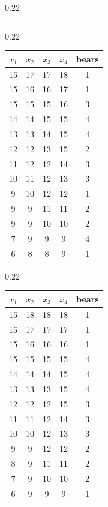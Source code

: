 \documentclass[10pt]{article}
\theoremstyle{definition}
\begin{document}
\begin{table}[h]
\begin{subtable}{0.22\textwidth}
\begin{tabular*}{\linewidth}{@{\extracolsep{\fill}}ccccc}
\bottomrule
\end{tabular*}
\label{tab:sub2}
\end{subtable}%
\hfill
\begin{subtable}{0.22\textwidth}
\begin{tabular*}{\linewidth}{@{\extracolsep{\fill}}ccccc}
\toprule
$x_1$ & $x_2$ & $x_3$ & $x_4$  &  bears \\
\midrule
15& 17& 17& 18&1 \\
15& 16 &16 &17&1 \\
15& 15& 15& 16 & 3 \\
\hline
14& 14& 15 &15& 4 \\
13& 13& 14 &15&  4 \\
12& 12& 13& 15 & 2 \\
\hline
11 &12& 12& 14&3  \\
10& 11& 12& 13 &3\\
9 & 10& 12& 12& 1\\
\hline
9 &9& 11 &11& 2 \\
9 &9 &10& 10 &2\\
7 &9& 9& 9 & 4\\
\hline
6& 8 &8& 9& 1\\
\bottomrule
\end{tabular*}
 \label{tab:sub3}
\end{subtable}
\hfill
\begin{subtable}{0.22\textwidth}
\begin{tabular*}{\linewidth}{@{\extracolsep{\fill}}ccccc} 
\toprule
$x_1$ & $x_2$ & $x_3$ & $x_4$  &  bears \\
\midrule
15 &  18 &  18  & 18  &  1  \\
15 & 17  & 17 & 17 &  1  \\
15 &  16 &  16  & 16  &  1  \\
\hline
15 &  15  & 15 &  15  &   4  \\
14  & 14  & 14  & 15 &   4  \\
13  & 13  & 13 & 15  &   4  \\
\hline
12  & 12 &  12 &  15 &  3   \\
11  & 11 &  12  & 14 &  3 \\
10 &  10  & 12 &  13   &  3 \\
\hline
9  & 9 &  12 &  12  &   2 \\ 
8  & 9 &  11 &  11  &   2 \\
7  & 9  & 10 &  10  &  2 \\
\hline
6  & 9  & 9 &  9 & 1  \\ 
\bottomrule
\end{tabular*}
\label{tab:sub4}
\end{subtable}%
\hfill
\end{table}
\end{document}
